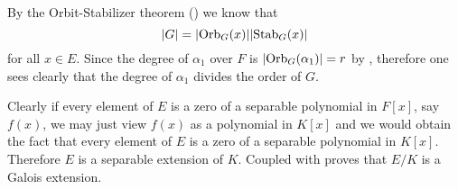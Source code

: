 \begin{questions}
    \item By the Orbit-Stabilizer theorem () we know that
    \[
       |G| = |\mathrm{Orb}_{G}(x)||\mathrm{Stab}_{G}(x)| 
    \]
    for all $x \in E$. Since the degree of $\alpha_1$ over $F$ is $|\mathrm{Orb}_{G}(\alpha_1)| = r$ by , therefore one sees clearly that the degree of $\alpha_1$ divides the order of $G$.

    \item Clearly if every element of $E$ is a zero of a separable polynomial in $F[x]$, say $f(x)$, we may just view $f(x)$ as a polynomial in $K[x]$ and we would obtain the fact that every element of $E$ is a zero of a separable polynomial in $K[x]$. Therefore $E$ is a separable extension of $K$. Coupled with  proves that $E/K$ is a Galois extension.
\end{questions}
